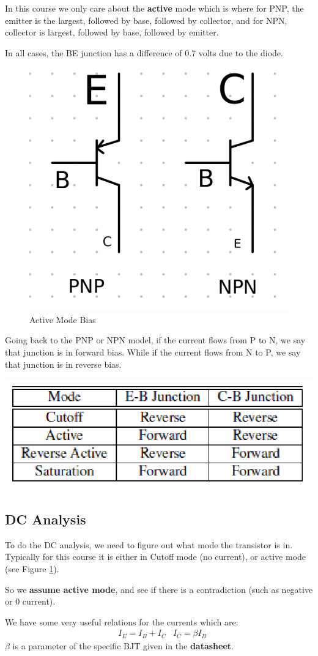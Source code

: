 \documentclass[12pt,letterpaper]{article} \usepackage{amsmath} \usepackage{graphicx} \usepackage[margin=1in]{geometry} \usepackage{longtable}  \usepackage{amssymb}
\begin{document}
	In this course we only care about the \textbf{active} mode which is where for PNP, the emitter is the largest, followed by base, followed by collector, and for NPN, collector is largest, followed by base, followed by emitter. 
	
	In all cases, the BE junction has a difference of 0.7 volts due to the diode. 
	\begin{figure}
		\centering
		\includegraphics[width=0.4\linewidth]{bjt-biassing}
		\caption{Active Mode Bias}
		\label{figure:bjt-active-mode-bias}
		
	\end{figure}
	
	Going back to the PNP or NPN model, if the current flows from P to N, we say that junction is in forward bias. While if the current flows from N to P, we say that junction is in reverse bias. 
	\begin{center}
		\includegraphics[width=0.5\linewidth]{bjt-bias-table}
	\end{center}
	
	\subsection{DC Analysis}
	To do the DC analysis, we need to figure out what mode the transistor is in. Typically for this course it is either in Cutoff mode (no current), or active mode (see Figure \ref{figure:bjt-active-mode-bias}).
	
	So we \textbf{assume active mode}, and see if there is a contradiction (such as negative or 0 current).
	
	We have some very useful relations for the currents which are:
	\begin{align*}
		&I_E = I_B + I_C & I_C = \beta I_B
	\end{align*}
	$\beta$ is a parameter of the specific BJT given in the \textbf{datasheet}.
	
\end{document}

